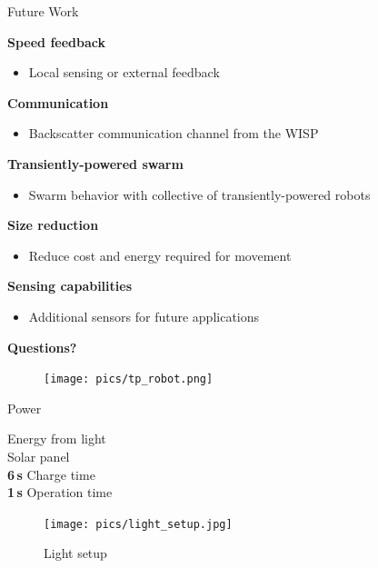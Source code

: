 \documentclass{beamer}
\begin{document}
\begin{frame}{Future Work}

	\textbf{Speed feedback} \\
	\begin{itemize}
		\item Local sensing or external feedback
	\end{itemize}
	\textbf{Communication} \\
	\begin{itemize}
		\item Backscatter communication channel from the WISP
	\end{itemize}
	\textbf{Transiently-powered swarm} \\
	\begin{itemize}
		\item Swarm behavior with collective of transiently-powered robots
	\end{itemize}
	\textbf{Size reduction} \\
	\begin{itemize}
		\item Reduce cost and energy required for movement
	\end{itemize}
	\textbf{Sensing capabilities} \\
	\begin{itemize}
		\item Additional sensors for future applications
	\end{itemize}
	
\end{frame}

\begin{frame}{}
	\begin{center}
		\textbf{\huge{Questions?}}
		\vspace{2em}
		\begin{figure}
			\texttt{[image: pics/tp\_robot.png]}
		\end{figure}
	\end{center}
\end{frame}


\begin{frame}[noframenumbering]{Power}
	\vspace{1em}
	\begin{minipage}{0.35\textwidth}
	Energy from light \\
	
	Solar panel \\
	
	\textbf{6\,s} Charge time \\
	
	\textbf{1\,s} Operation time \\
	
	\end{minipage}
	\begin{minipage}{0.64\textwidth}\raggedleft
		\begin{figure}
			\texttt{[image: pics/light\_setup.jpg]}
			\caption*{Light setup}
		\end{figure}
	\end{minipage}
\end{frame}
\end{document}
